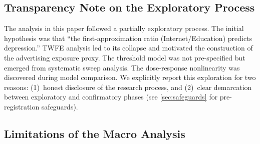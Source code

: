 \documentclass[a4paper,11pt,titlepage]{article}
\begin{document}
\subsection{Transparency Note on the Exploratory Process}\label{sec:transparency}

The analysis in this paper followed a partially exploratory process. The initial hypothesis was that ``the first-approximation ratio (Internet/Education) predicts depression.'' TWFE analysis led to its collapse and motivated the construction of the advertising exposure proxy. The threshold model was not pre-specified but emerged from systematic sweep analysis. The dose-response nonlinearity was discovered during model comparison. We explicitly report this exploration for two reasons: (1)~honest disclosure of the research process, and (2)~clear demarcation between exploratory and confirmatory phases (see \cref{sec:safeguards} for pre-registration safeguards).


\subsection{Limitations of the Macro Analysis}\label{sec:macro-limits}
\end{document}
